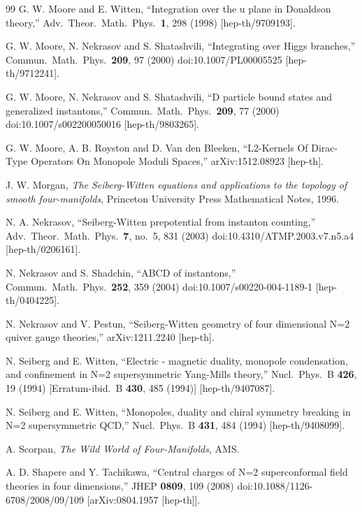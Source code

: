 \begin{thebibliography}{99}
 G. W. Moore and E. Witten, ``Integration over the u plane in Donaldson
theory,'' Adv.\ Theor.\ Math.\ Phys.\ \textbf{1}, 298 (1998) [hep-th/9709193].

 G. W. Moore, N. Nekrasov and S. Shatashvili, ``Integrating over Higgs
branches,'' Commun.\ Math.\ Phys.\ \textbf{209}, 97 (2000) doi:10.1007/PL00005525
[hep-th/9712241].

 G. W. Moore, N. Nekrasov and S. Shatashvili, ``D particle bound states and
generalized instantons,'' Commun.\ Math.\ Phys.\ \textbf{209}, 77 (2000)
doi:10.1007/s002200050016 [hep-th/9803265].

 G. W. Moore, A. B. Royston and D. Van den Bleeken, ``L2-Kernels Of
Dirac-Type Operators On Monopole Moduli Spaces,'' arXiv:1512.08923 [hep-th].

 J. W. Morgan, \emph{The Seiberg-Witten equations and applications to the
topology of smooth four-manifolds}, Princeton University Press Mathematical Notes, 1996.

 N. A. Nekrasov, ``Seiberg-Witten prepotential from instanton counting,''
Adv.\ Theor.\ Math.\ Phys.\ \textbf{7}, no.~5, 831 (2003)
doi:10.4310/ATMP.2003.v7.n5.a4 [hep-th/0206161].

 N. Nekrasov and S. Shadchin, ``ABCD of instantons,'' Commun.\ Math.\
Phys.\ \textbf{252}, 359 (2004) doi:10.1007/s00220-004-1189-1 [hep-th/0404225].

 N. Nekrasov and V. Pestun, ``Seiberg-Witten geometry of four dimensional
N=2 quiver gauge theories,'' arXiv:1211.2240 [hep-th].

 N. Seiberg and E. Witten, ``Electric - magnetic duality, monopole
condensation, and confinement in N=2 supersymmetric Yang-Mills theory,'' Nucl.\ Phys.\
B \textbf{426}, 19 (1994) [Erratum-ibid.\ B \textbf{430}, 485 (1994)] [hep-th/9407087].

\bibitem{ref47} N. Seiberg and E. Witten, ``Monopoles, duality and chiral symmetry breaking
in N=2 supersymmetric QCD,'' Nucl.\ Phys.\ B \textbf{431}, 484 (1994) [hep-th/9408099].

\bibitem{ref48} A. Scorpan, \emph{The Wild World of Four-Manifolds}, AMS.

\bibitem{ref49} A. D. Shapere and Y. Tachikawa, ``Central charges of N=2 superconformal
field theories in four dimensions,'' JHEP \textbf{0809}, 109 (2008)
doi:10.1088/1126-6708/2008/09/109 [arXiv:0804.1957 [hep-th]].


\end{thebibliography}

